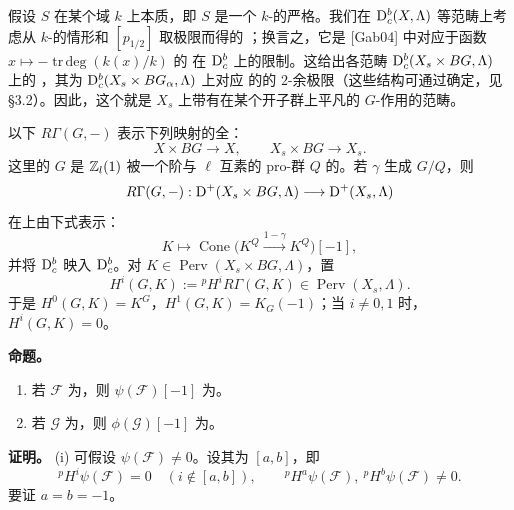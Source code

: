 假设 $S$ 在某个域 $k$ 上本质，即 $S$ 是一个 $k$-的严格。我们在 $\mathrm{D}_c^b(X,\Lambda)$ 等范畴上考虑从 $k$-的情形和 $[p_{1/2}]$ 取极限而得的 ；换言之，它是 [Gab04] 中对应于函数 $x\mapsto-\operatorname{tr\,deg}(k(x)/k)$ 的 在 $\mathrm{D}_c^b$ 上的限制。这给出各范畴 $\mathrm{D}_c^b(X_s\times BG,\Lambda)$ 上的 ，其为 $\mathrm{D}_c^b(X_s\times BG_\alpha,\Lambda)$ 上对应 的的 $2$-余极限（这些结构可通过确定，见 \S 3.2）。因此，这个就是 $X_s$ 上带有在某个开子群上平凡的 $G$-作用的范畴。

以下 $R\Gamma(G,-)$ 表示下列映射的全：
\[
X\times BG\longrightarrow X,\qquad X_s\times BG\longrightarrow X_s.
\]
这里的 $G$ 是 $\mathbb Z_l(1)$ 被一个阶与 $\ell$ 互素的 pro-群 $Q$ 的。若 $\gamma$ 生成 $G/Q$，则
\[
R\Gamma(G,-):\mathrm{D}^+(X_s\times BG,\Lambda)\longrightarrow\mathrm{D}^+(X_s,\Lambda)
\]
在上由下式表示：
\[
K\longmapsto\operatorname{Cone}\bigl(K^Q\xrightarrow{1-\gamma}K^Q\bigr)[-1],
\]
并将 $\mathrm{D}_c^b$ 映入 $\mathrm{D}_c^b$。对 $K\in\operatorname{Perv}(X_s\times BG,\Lambda)$，置
\[
H^i(G,K):={}^{p}H^iR\Gamma(G,K)\in\operatorname{Perv}(X_s,\Lambda).
\]
于是 $H^0(G,K)=K^G$，$H^1(G,K)=K_G(-1)$；当 $i\ne0,1$ 时，$H^i(G,K)=0$。

\par\medskip\noindent\textbf{命题。}
\begin{enumerate}[label=(\roman*)]
\item 若 $\mathcal F$ 为，则 $\psi(\mathcal F)[-1]$ 为。
\item 若 $\mathcal G$ 为，则 $\phi(\mathcal G)[-1]$ 为。
\end{enumerate}
\noindent\textbf{证明。} (i) 可假设 $\psi(\mathcal F)\ne0$。设其为 $[a,b]$，即
\[
{}^pH^i\psi(\mathcal F)=0\quad(i\notin[a,b]),\qquad
{}^pH^a\psi(\mathcal F),\ {}^pH^b\psi(\mathcal F)\ne0.
\]
要证 $a=b=-1$。

